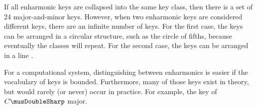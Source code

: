 
If all enharmonic keys are collapsed into the same key
class, then there is a set of 24 major-and-minor keys.
However, when two enharmonic keys are considered different
keys, there are an infinite number of keys. For the first
case, the keys can be arranged in a circular structure, such
as the circle of fifths, because eventually the classes will
repeat. For the second case, the keys can be arranged in a
line \parencite{temperley2000line}.

For a computational system, distinguishing between
enharmonics is easier if the vocabulary of keys is bounded.
Furthermore, many of those keys exist in theory, but would
rarely (or never) occur in practice. For example, the key of
$C\musDoubleSharp$ major.
